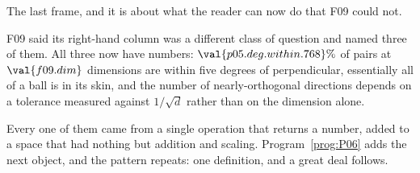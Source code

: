 \begin{fr}
The last frame, and it is about what the reader can now do that F09 could not.

F09 said its right-hand column was a different class of question and named
three of them. All three now have numbers: $\val{p05.deg.within.768}\%$ of
pairs at $\val{f09.dim}$ dimensions are within five degrees of perpendicular,
essentially all of a ball is in its skin, and the
number of nearly-orthogonal directions depends on a tolerance measured against
$1/\sqrt{d}$ rather than on the dimension alone.

Every one of them came from a single operation that returns a number, added to
a space that had nothing but addition and scaling. Program~\ref{prog:P06} adds
the next object, and the pattern repeats: one definition, and a great deal
follows.
\end{fr}

